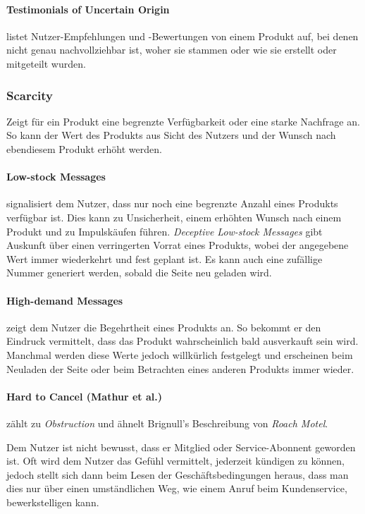 \documentclass[a4paper]{article}
\begin{document}
\paragraph{Testimonials of Uncertain Origin} listet Nutzer-Empfehlungen und -Bewertungen von einem Produkt auf, bei denen nicht genau nachvollziehbar ist, woher sie stammen oder wie sie erstellt oder mitgeteilt wurden. 

\subsubsection{Scarcity}
Zeigt für ein Produkt eine begrenzte Verfügbarkeit oder eine starke Nachfrage an. So kann der Wert des Produkts aus Sicht des Nutzers und der Wunsch nach ebendiesem Produkt erhöht werden.

\paragraph{Low-stock Messages} signalisiert dem Nutzer, dass nur noch eine begrenzte Anzahl eines Produkts verfügbar ist. Dies kann zu Unsicherheit, einem erhöhten Wunsch nach einem Produkt und zu Impulskäufen führen. \textit{Deceptive Low-stock Messages} gibt Auskunft über einen verringerten Vorrat eines Produkts, wobei der angegebene Wert immer wiederkehrt und fest geplant ist. Es kann auch eine zufällige Nummer generiert werden, sobald die Seite neu geladen wird. 

\paragraph{High-demand Messages} zeigt dem Nutzer die Begehrtheit eines Produkts an. So bekommt er den Eindruck vermittelt, dass das Produkt wahrscheinlich bald ausverkauft sein wird. Manchmal werden diese Werte jedoch willkürlich festgelegt und erscheinen beim Neuladen der Seite oder beim Betrachten eines anderen Produkts immer wieder.

\paragraph{Hard to Cancel (Mathur et al.)} zählt zu \textit{Obstruction} und ähnelt Brignull's Beschreibung von \textit{Roach Motel}. 

Dem Nutzer ist nicht bewusst, dass er Mitglied oder Service-Abonnent geworden ist. Oft wird dem Nutzer das Gefühl vermittelt, jederzeit kündigen zu können, jedoch stellt sich dann beim Lesen der Geschäftsbedingungen heraus, dass man dies nur über einen umständlichen Weg, wie einem Anruf beim Kundenservice, bewerkstelligen kann. 
\end{document}
